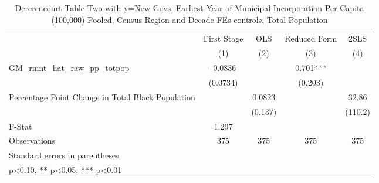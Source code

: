 \begin{table}[htbp]\centering
\def\sym#1{\ifmmode^{#1}\else\(^{#1}\)\fi}
\caption{Dererencourt Table Two with y=New Govs, Earliest Year of Municipal Incorporation Per Capita (100,000) Pooled, Census Region and Decade FEs controls, Total Population}
\begin{tabular}{l*{4}{c}}
\toprule
                    & First Stage   &         OLS   &Reduced Form   &        2SLS   \\
                    &\multicolumn{1}{c}{(1)}   &\multicolumn{1}{c}{(2)}   &\multicolumn{1}{c}{(3)}   &\multicolumn{1}{c}{(4)}   \\
\midrule
GM\_rmnt\_hat\_raw\_pp\_totpop&     -0.0836   &               &       0.701***&               \\
                    &    (0.0734)   &               &     (0.203)   &               \\
\addlinespace
Percentage Point Change in Total Black Population&               &      0.0823   &               &       32.86   \\
                    &               &     (0.137)   &               &     (110.2)   \\
\midrule
F-Stat              &       1.297   &               &               &               \\
Observations        &         375   &         375   &         375   &         375   \\
\bottomrule
\multicolumn{5}{l}{\footnotesize Standard errors in parentheses}\\
\multicolumn{5}{l}{\footnotesize * p<0.10, ** p<0.05, *** p<0.01}\\
\end{tabular}
\end{table}

